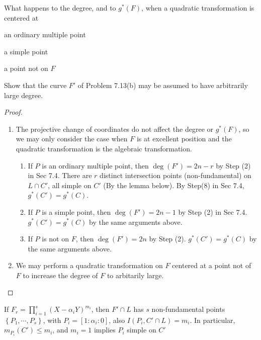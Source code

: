 \documentclass{solution}
\begin{document}
\begin{problem}{7.14}
    \begin{inparaenum}
        \item What happens to the degree, and to $g^*(F)$, when a quadratic transformation is centered at \begin{inparaenum}
            \item an ordinary multiple point
            \item a simple point
            \item a point not on $F$
        \end{inparaenum}
        \item Show that the curve $F'$ of Problem 7.13(b) may be assumed to have arbitrarily large degree.
    \end{inparaenum}
\end{problem}

\begin{proof}
    \begin{enumerate}
        \item The projective change of coordinates do not affect the degree or $g^*(F)$, so we may only consider the case when $F$ is at excellent position and the quadratic transformation is the algebraic transformation.
        \begin{enumerate}
            \item If $P$ is an ordinary multiple point, then $\deg(F') = 2n - r$ by Step (2) in Sec 7.4. There are $r$ distinct intersection points (non-fundamental) on $L \cap C'$, all simple on $C'$ (By the lemma below). By Step(8) in Sec 7.4, $g^*(C') = g^*(C)$.
            \item If $P$ is a simple point, then $\deg(F') = 2n - 1$ by Step (2) in Sec 7.4. $g^*(C') = g^*(C)$ by the same arguments above.
            \item If $P$ is not on $F$, then $\deg(F') = 2n$ by Step (2). $g^*(C') = g^*(C)$ by the same arguments above.
        \end{enumerate}
        \item We may perform a quadratic transformation on $F$ centered at a point not of $F$ to increase the degree of $F$ to arbitarily large.
    \end{enumerate}
\end{proof}

\begin{lemma} \label{lem:intersection-number-non-dundamental}
    If $F_r = \prod\limits_{i = 1}^{s} (X - \alpha_i Y)^{m_i}$, then $F' \cap L$ has $s$ non-fundamental points $\left\lbrace P_1, \cdots, P_s \right\rbrace$, with $P_i = [1:\alpha_i:0]$, also $I(P_i, C' \cap L) = m_i$. In particular, $m_{P_i}(C') \le m_i$, and $m_i = 1$ implies $P_i$ simple on $C'$
\end{lemma}
\end{document}
